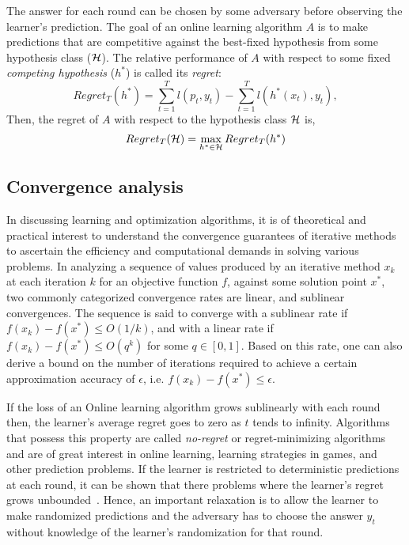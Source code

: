 The answer for each round can be chosen by some
adversary before observing the learner's prediction.
The goal of an online learning algorithm $A$ is to make predictions that are competitive against
the best-fixed hypothesis from some hypothesis class ($\mathcal{H}$).
The relative performance of $A$ with respect to some fixed \textit{competing hypothesis} ($h^\ast$)
is called its \textit{regret}:
\begin{equation}
	\label{eqn:regret} Regret_T(h^*) = \sum_{t=1}^T
	l(p_t, y_t) - \sum_{t=1}^T l(h^*(x_t), y_t),
\end{equation} Then, the regret of $A$ with respect to
the hypothesis class $\mathcal{H}$ is,
\begin{equation}
	\label{eqn:regret_all} Regret_T(\mathcal{H}) =
	\max_{h^* \in \mathcal{H}} Regret_T(h^*)
\end{equation}

\subsection{Convergence
	analysis} In discussing learning and optimization algorithms, it is of theoretical and practical
interest to understand the convergence guarantees of iterative methods to ascertain the efficiency
and computational demands in solving various problems.
In analyzing a sequence of values produced by an iterative method $x_k$ at each iteration $k$ for
an objective function $f$, against some solution point $x^{\ast}$, two commonly categorized
convergence rates are linear, and sublinear convergences.
The sequence is said to converge with a sublinear rate if $f(x_k) - f(x^\ast) \leq O(1/k)$, and
with a linear rate if $f(x_k) - f(x^\ast) \leq O(q^k)$ for some $q \in [0, 1]$.
Based on this rate, one can also derive a bound on the number of iterations required to achieve a
certain approximation accuracy of $\epsilon$, i.e. $f(x_k) - f(x^\ast) \leq \epsilon$.

If the loss of an Online learning algorithm grows sublinearly with each round then, the learner's
average regret goes to zero as $t$ tends to infinity.
Algorithms that possess this property are called \textit{no-regret} or regret-minimizing algorithms
and are of great interest in online learning, learning strategies in games, and other prediction
problems.
If the learner is restricted to deterministic predictions at each round, it can be shown that there
problems where the learner's regret grows unbounded~\cite{coverBehavior1965}.
Hence, an important relaxation is to allow the learner to make randomized predictions and the
adversary has to choose the answer $y_t$ without knowledge of the learner's randomization for that
round.

